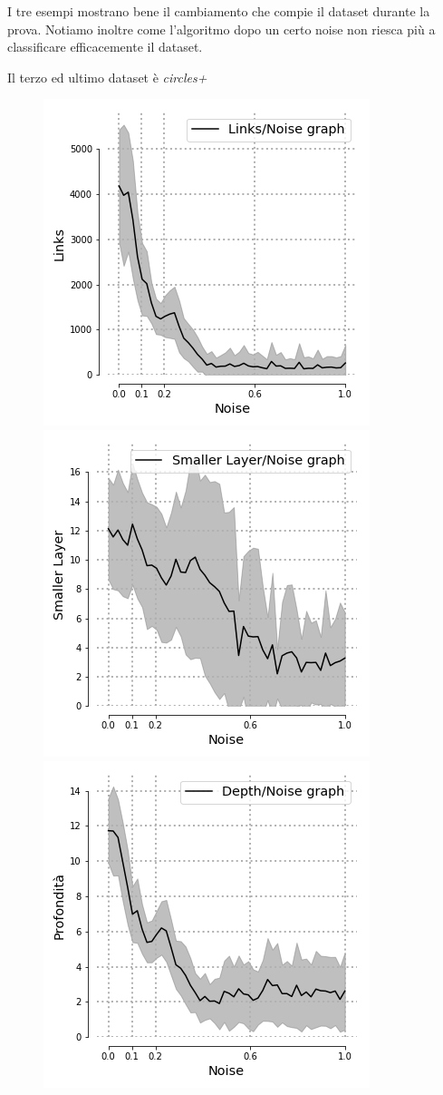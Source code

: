 \documentclass[12pt,a4paper]{report}
\begin{document}
I tre esempi mostrano bene il cambiamento che compie il dataset durante la prova.
Notiamo inoltre come l'algoritmo dopo un certo noise non riesca più a classificare efficacemente il dataset.

\newpage

Il terzo ed ultimo dataset è \textit{circles+}

\begin{figure}[H]
 \centering
 \includegraphics[scale = 0.5]{images/links_noise_circles+}
 \includegraphics[scale = 0.5]{images/small_noise_circles+}
 \includegraphics[scale = 0.5]{images/depth_noise_circles+}

\end{figure}
\end{document}
